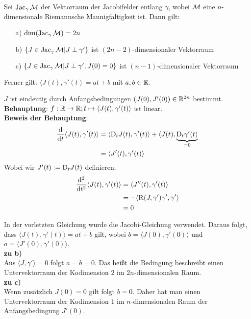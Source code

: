 
\begin{lem}

Sei $\operatorname{Jac}_\gamma \mathcal{M}$ der Vektorraum der Jacobifelder entlang $\gamma$, wobei 
$\mathcal{M}$ eine $n$-dimensionale Riemannsche Mannigfaltigkeit ist.
Dann gilt:
\begin{itemize}
\item[a)] $\dim (\operatorname{Jac}_\gamma \mathcal{M}) = 2n$
\item[b)] $\{ J \in \operatorname{Jac}_\gamma \mathcal{M} \vert J \perp \gamma' \}$ ist 
    $(2n-2)$-dimensionaler Vektorraum
\item[c)] $\{ J \in \operatorname{Jac}_\gamma \mathcal{M} \vert J \perp \gamma' , J(0)=0\}$ ist 
    $(n-1)$-dimensionaler Vektorraum
\end{itemize}
Ferner gilt: $\langle J(t) , \gamma'(t) = at + b$ mit $a,b \in \mathbb{R}$.
\end{lem}
\begin{bew}
$J$ ist eindeutig durch Anfangsbedingungen $(J(0),J'(0))\in\mathbb{R}^{2n}$ bestimmt.\\
\textbf{Behauptung}: $f: \mathbb{R}\to\mathbb{R}; t \mapsto \langle J(t) , \gamma'(t)\rangle$
ist linear.\\
\textbf{Beweis der Behauptung}:
\begin{align*}
\dv{t}\langle J(t), \gamma'(t)\rangle &= \langle \mathrm{D}_t J(t), \gamma'(t) \rangle 
+ \langle J(t),\underbrace{\mathrm{D}_t \gamma'(t)}_{=0}\\
&=  \langle J'(t) , \gamma'(t)\rangle
\end{align*}
Wobei wir $J'(t):=\mathrm{D}_t J(t)$ definieren.
\begin{align*}
\dv[2]{t} \langle J(t), \gamma'(t)\rangle &= \langle J''(t), \gamma'(t)\rangle \\
&= -\langle\operatorname{R}(J, \gamma')\gamma', \gamma'\rangle\\
&= 0
\end{align*}

In der vorletzten Gleichung wurde die Jacobi-Gleichung verwendet.
Daraus folgt, dass $\langle J(t), \gamma'(t) \rangle = at + b$ gilt,
wobei $b=\langle J(0), \gamma'(0) \rangle$ und $a = \langle J'(0), \gamma'(0)\rangle$.\\
\textbf{zu b)}\\
Aus $\langle J, \gamma' \rangle = 0 $ folgt $a = b = 0$.
Das heißt die Bedingung beschreibt einen Untervektorraum der Kodimension $2$ im $2n$-dimensionalen
Raum.\\
\textbf{zu c)}\\
Wenn zusätzlich $J(0)=0$ gilt folgt $b = 0$.
Daher hat man einen Untervektorraum der Kodimension $1$ im $n$-dimensionalen Raum
der Anfangsbedingung $J'(0)$.
\end{bew}


